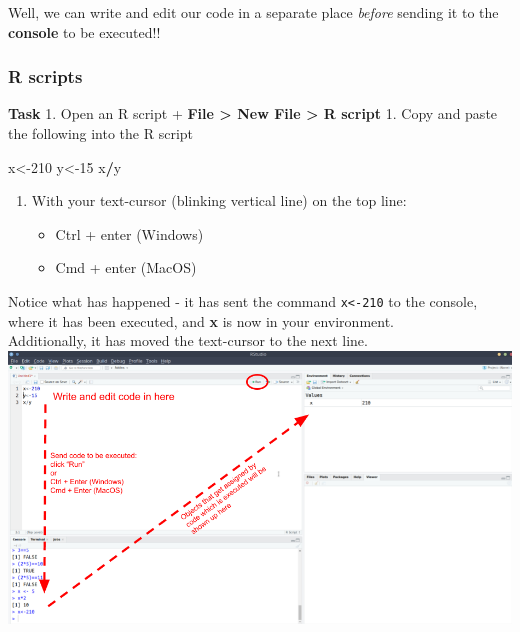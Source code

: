 \documentclass[]{book}
\newenvironment{Shaded}{\begin{snugshade}}{\end{snugshade}}
\newcommand{\DecValTok}[1]{\textcolor[rgb]{0.00,0.00,0.81}{#1}}
\newcommand{\NormalTok}[1]{#1}
\newcommand{\OperatorTok}[1]{\textcolor[rgb]{0.81,0.36,0.00}{\textbf{#1}}}
\providecommand{\tightlist}{%
  \setlength{\itemsep}{0pt}\setlength{\parskip}{0pt}}
\begin{document}
Well, we can write and edit our code in a separate place \emph{before} sending it to the \textbf{console} to be executed!!

\hypertarget{r-scripts}{%
\subsubsection*{R scripts}\label{r-scripts}}

\textbf{Task}
1. Open an R script
+ \textbf{File \textgreater{} New File \textgreater{} R script}
1. Copy and paste the following into the R script

\begin{Shaded}
\begin{Highlighting}[]
\NormalTok{x<-}\DecValTok{210}
\NormalTok{y<-}\DecValTok{15}
\NormalTok{x}\OperatorTok{/}\NormalTok{y}
\end{Highlighting}
\end{Shaded}

\begin{enumerate}
\def\labelenumi{\arabic{enumi}.}
\tightlist
\item
  With your text-cursor (blinking vertical line) on the top line:

  \begin{itemize}
  \tightlist
  \item
    Ctrl + enter (Windows)
  \item
    Cmd + enter (MacOS)
  \end{itemize}
\end{enumerate}

Notice what has happened - it has sent the command \texttt{x\textless{}-210} to the console, where it has been executed, and \textbf{x} is now in your environment.\\
Additionally, it has moved the text-cursor to the next line.\\
\includegraphics{images/installing_intro/reditor.png}
\end{document}
